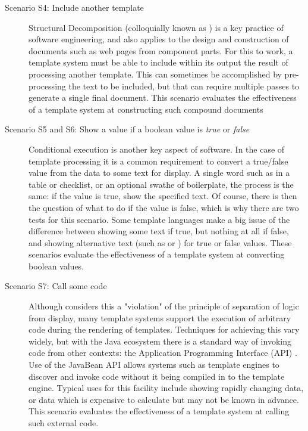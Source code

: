 \begin{description}
\item[Scenario S4: Include another template] \hfill

Structural Decomposition (colloquially known as ) is a key practice of software engineering, and also applies to the design and construction of documents such as web pages from component parts. For this to work, a template system must be able to include within its output the result of processing another template. This can sometimes be accomplished by pre-processing the text to be included, but that can require multiple passes to generate a single final document. This scenario evaluates the effectiveness of a template system at constructing such compound documents

\item[Scenario S5 and S6: Show a value if a boolean value is \emph{true} or \emph{false}] \hfill

Conditional execution is another key aspect of software. In the case of template processing it is a common requirement to convert a true/false value from the data to some text for display. A single word such as  in a table or checklist, or an optional swathe of boilerplate, the process is the same: if the value is true, show the specified text. Of course, there is then the question of what to do if the value is false, which is why there are two tests for this scenario. Some template languages make a big issue of the difference between showing some text if true, but nothing at all if false, and showing alternative text (such as  or ) for true or false values. These scenarios evaluate the effectiveness of a template system at converting boolean values.

\item[Scenario S7: Call some code] \hfill

Although \cite{Parr2004} considers this a "violation" of the principle of separation of logic from display, many template systems support the execution of arbitrary code during the rendering of templates. Techniques for achieving this vary widely, but with the Java ecosystem there is a standard way of invoking code from other contexts: the  Application Programming Interface (API) \citep{Oracle2018JavaBean}. Use of the JavaBean API allows systems such as template engines to discover and invoke code without it being compiled in to the template engine. Typical uses for this facility include showing rapidly changing data, or data which is expensive to calculate but may not be known in advance. This scenario evaluates the effectiveness of a template system at calling such external code.

\end{description}

